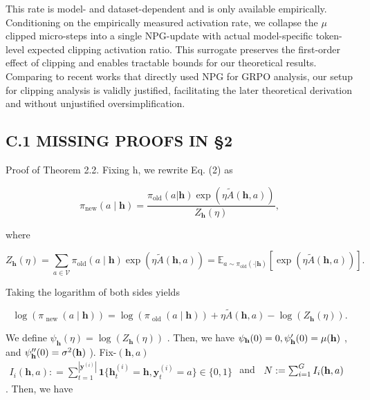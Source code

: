 \documentclass[
  10
]{article}
\begin{document}
This rate is model- and dataset-dependent and is only available
empirically. Conditioning on the empirically measured activation rate,
we collapse the \(\mu\) clipped micro-steps into a single NPG-update
with actual model-specific token-level expected clipping activation
ratio. This surrogate preserves the first-order effect of clipping and
enables tractable bounds for our theoretical results. Comparing to
recent works that directly used NPG for GRPO analysis, our setup for
clipping analysis is validly justified, facilitating the later
theoretical derivation and without unjustified oversimplification.

\subsection{C.1 MISSING PROOFS IN §2}\label{c.1-missing-proofs-in-2}

Proof of Theorem 2.2. Fixing h, we rewrite Eq. (2) as

\[
\pi_ {\mathrm{new}} (a \mid \mathbf {h}) = \frac {\pi_ {\mathrm{old}} (a | \mathbf {h}) \exp (\eta \tilde {A} (\mathbf {h} , a))}{Z _ {\mathbf {h}} (\eta)},
\]

where

\[
Z _ {\mathbf {h}} (\eta) = \sum_ {a \in \mathcal {V}} \pi_ {\mathrm{old}} (a \mid \mathbf {h}) \exp (\eta \tilde {A} (\mathbf {h}, a)) = \mathbb {E} _ {a \sim \pi_ {\mathrm{old}} (\cdot | \mathbf {h})} [ \exp (\eta \tilde {A} (\mathbf {h}, a)) ].
\]

Taking the logarithm of both sides yields

\[
\log (\pi_ {\text { new }} (a \mid \mathbf {h})) = \log (\pi_ {\text { old }} (a \mid \mathbf {h})) + \eta \tilde {A} (\mathbf {h}, a) - \log (Z _ {\mathbf {h}} (\eta)). \tag {10}
\]

We define
\(\psi _ { \mathbf { h } } ( \eta ) = \log ( Z _ { \mathbf { h } } ( \eta ) )\)
. Then, we have
\(\psi _ { \bf h } ( 0 ) = 0 , \psi _ { \bf h } ^ { \prime } ( 0 ) = \mu ( \bf h )\)
, and
\(\psi _ { \bf h } ^ { \prime \prime } ( 0 ) = \sigma ^ { 2 } { \left( { \bf h } \right) }\)
). Fix-\(( \mathbf { h } , a )\)
\(\begin{array} { r } { I _ { i } ( \mathbf { h } , a ) : = \sum _ { t = 1 } ^ { | \mathbf { y } ^ { ( i ) } | } \mathbf { 1 } \{ \mathbf { h } _ { t } ^ { ( i ) } = \mathbf { h } , \mathbf { y } _ { t } ^ { ( i ) } = a \} \in \{ 0 , 1 \} } \end{array}\)
and
\(\begin{array} { r } { N : = \sum _ { i = 1 } ^ { G } I _ { i } ( { \bf h } , a ) } \end{array}\)
. Then, we have
\end{document}
